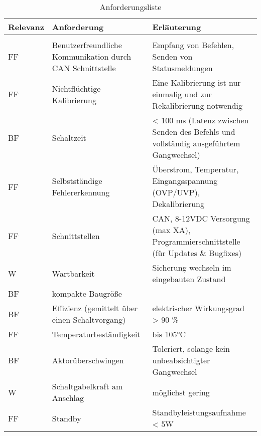 \begin{table}[h]
	\centering
		\begin{tabular}{l|p{7cm}|p{7cm}}
			Relevanz & Anforderung & Erläuterung \\ \hline
			& &\\
			FF & Benutzerfreundliche Kommunikation durch CAN Schnittstelle & Empfang von Befehlen, Senden von Statusmeldungen \\
			FF & Nichtflüchtige Kalibrierung & Eine Kalibrierung ist nur einmalig und zur Rekalibrierung notwendig \\
			BF & Schaltzeit & < 100 ms (Latenz zwischen Senden des Befehls und vollständig ausgeführtem Gangwechsel) \\
			FF & Selbstständige Fehlererkennung & Überstrom, Temperatur, Eingangsspannung (OVP/UVP), Dekalibrierung \\
			FF & Schnittstellen & CAN, 8-12VDC Versorgung (max XA), Programmierschnittstelle (für Updates \& Bugfixes) \\
			W & Wartbarkeit & Sicherung wechseln im eingebauten Zustand \\
			BF & kompakte Baugröße & \\
			BF & Effizienz (gemittelt über einen Schaltvorgang) & elektrischer Wirkungsgrad > 90 \% \\
			FF & Temperaturbeständigkeit & bis 105°C \\
			BF & Aktorüberschwingen & Toleriert, solange kein unbeabsichtigter Gangwechsel \\
			W & Schaltgabelkraft am Anschlag & möglichst gering \\
			FF & Standby & Standbyleistungsaufnahme < 5W \\
		\end{tabular}
	\caption{Anforderungsliste}
	\label{tab:Anforderungsliste}
\end{table}